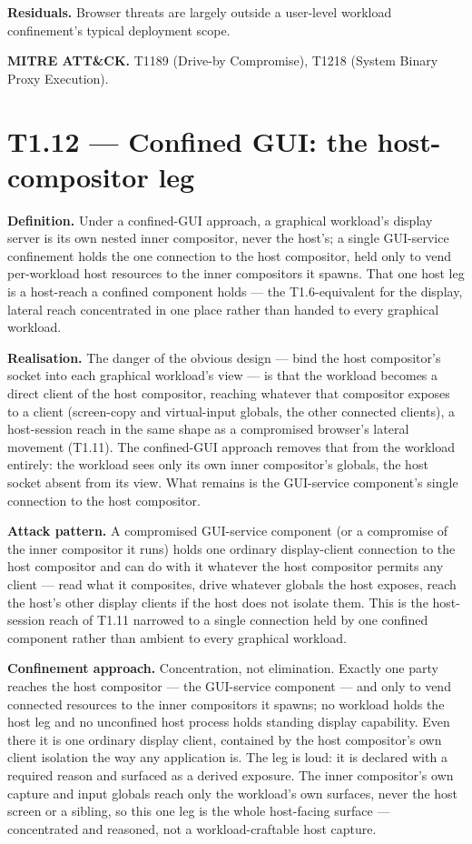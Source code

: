 \textbf{Residuals.} Browser threats are largely outside a user-level
workload confinement's typical deployment scope.

\textbf{MITRE ATT\&CK.} T1189 (Drive-by Compromise), T1218 (System
Binary Proxy Execution).

\hypertarget{t1.12-confined-gui-the-host-compositor-leg}{%
\section{T1.12 --- Confined GUI: the host-compositor
leg}\label{t1.12-confined-gui-the-host-compositor-leg}}

\textbf{Definition.} Under a confined-GUI approach, a graphical
workload's display server is its own nested inner compositor, never the
host's; a single GUI-service confinement holds the one connection to the
host compositor, held only to vend per-workload host resources to the
inner compositors it spawns. That one host leg is a host-reach a
confined component holds --- the T1.6-equivalent for the display,
lateral reach concentrated in one place rather than handed to every
graphical workload.

\textbf{Realisation.} The danger of the obvious design --- bind the host
compositor's socket into each graphical workload's view --- is that the
workload becomes a direct client of the host compositor, reaching
whatever that compositor exposes to a client (screen-copy and
virtual-input globals, the other connected clients), a host-session
reach in the same shape as a compromised browser's lateral movement
(T1.11). The confined-GUI approach removes that from the workload
entirely: the workload sees only its own inner compositor's globals, the
host socket absent from its view. What remains is the GUI-service
component's single connection to the host compositor.

\textbf{Attack pattern.} A compromised GUI-service component (or a
compromise of the inner compositor it runs) holds one ordinary
display-client connection to the host compositor and can do with it
whatever the host compositor permits any client --- read what it
composites, drive whatever globals the host exposes, reach the host's
other display clients if the host does not isolate them. This is the
host-session reach of T1.11 narrowed to a single connection held by one
confined component rather than ambient to every graphical workload.

\textbf{Confinement approach.} Concentration, not elimination. Exactly
one party reaches the host compositor --- the GUI-service component ---
and only to vend connected resources to the inner compositors it spawns;
no workload holds the host leg and no unconfined host process holds
standing display capability. Even there it is one ordinary display
client, contained by the host compositor's own client isolation the way
any application is. The leg is loud: it is declared with a required
reason and surfaced as a derived exposure. The inner compositor's own
capture and input globals reach only the workload's own surfaces, never
the host screen or a sibling, so this one leg is the whole host-facing
surface --- concentrated and reasoned, not a workload-craftable host
capture.

